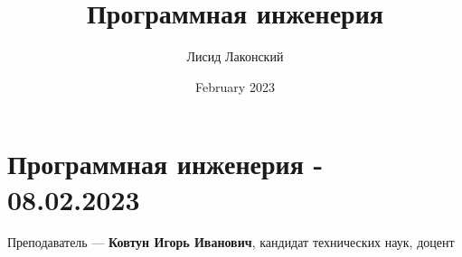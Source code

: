 \documentclass{article}
\title{Программная инженерия}
\author{Лисид Лаконский}
\date{February 2023}
\begin{document}
\raggedright

\maketitle
\tableofcontents
\pagebreak

\section{Программная инженерия - 08.02.2023}

Преподаватель — \textbf{Ковтун Игорь Иванович}, кандидат технических наук, доцент
\end{document}
